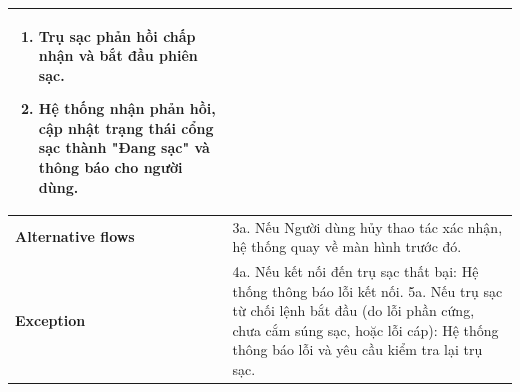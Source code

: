 \begin{itemize}
\begin{longtable}{|m{}|m{}|}
\begin{enumerate}[label=\arabic*.]
    \item Trụ sạc phản hồi chấp nhận và bắt đầu phiên sạc.
    \item Hệ thống nhận phản hồi, cập nhật trạng thái cổng sạc thành "Đang sạc" và thông báo cho người dùng.
  \end{enumerate}\\
  \hline
  \textbf{Alternative flows} &
  3a. Nếu Người dùng hủy thao tác xác nhận, hệ thống quay về màn hình trước đó.\\
  \hline
  \textbf{Exception} &
  4a. Nếu kết nối đến trụ sạc thất bại: Hệ thống thông báo lỗi kết nối. \newline
  5a. Nếu trụ sạc từ chối lệnh bắt đầu (do lỗi phần cứng, chưa cắm súng sạc, hoặc lỗi cáp): Hệ thống thông báo lỗi và yêu cầu kiểm tra lại trụ sạc.\\
  \hline
  \end{longtable}


\end{itemize}
